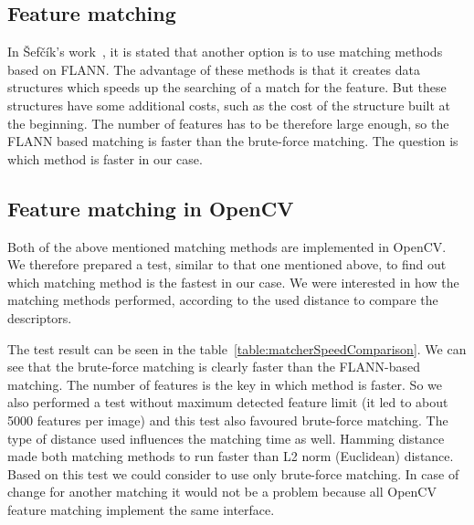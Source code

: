 \documentclass[thesis=B,english]{FITthesis}[2019/12/23]
\begin{document}
                
            \subsection{Feature matching}
                In Šefčík's work~\cite{Sefcik2020}, it is stated that another option is to use matching methods based on FLANN. The advantage of these methods is that it creates data structures which speeds up the searching of a match for the feature. But these structures have some additional costs, such as the cost of the structure built at the beginning. The number of features has to be therefore large enough, so the FLANN based matching is faster than the brute-force matching. The question is which method is faster in our case.
            
            \subsection{Feature matching in OpenCV}
                Both of the above mentioned matching methods are implemented in OpenCV. We therefore prepared a test, similar to that one mentioned above, to find out which matching method is the fastest in our case. We were interested in how the matching methods performed, according to the used distance to compare the descriptors.
            
                The test result can be seen in the table~\ref{table:matcherSpeedComparison}. We can see that the brute-force matching is clearly faster than the FLANN-based matching. The number of features is the key in which method is faster. So we also performed a test without maximum detected feature limit (it led to about 5000 features per image) and this test also favoured brute-force matching. The type of distance used influences the matching time as well. Hamming distance made both matching methods to run faster than L2 norm (Euclidean) distance. Based on this test we could consider to use only brute-force matching. In case of change for another matching it would not be a problem because all OpenCV feature matching implement the same interface.
                
\end{document}
